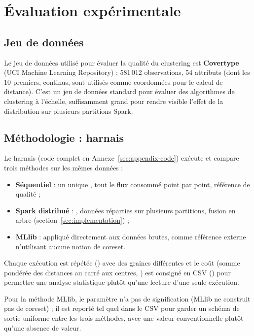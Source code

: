 \section{Évaluation expérimentale}
\label{sec:experiments}

\subsection{Jeu de données}

Le jeu de données utilisé pour évaluer la qualité du clustering est
\textbf{Covertype} (UCI Machine Learning Repository) : 581\,012 observations,
54 attributs (dont les 10 premiers, continus, sont utilisés comme
coordonnées pour le calcul de distance). C'est un jeu de données standard
pour évaluer des algorithmes de clustering à l'échelle, suffisamment grand
pour rendre visible l'effet de la distribution sur plusieurs partitions
Spark.

\subsection{Méthodologie : harnais }

Le harnais  (code complet en
Annexe~\ref{sec:appendix-code}) exécute et compare trois méthodes sur les
mêmes données :
\begin{itemize}
  \item \textbf{Séquentiel} : un unique , tout le flux
        consommé point par point, référence de qualité ;
  \item \textbf{Spark distribué} : ,
        données réparties sur plusieurs partitions, fusion en arbre
        (section~\ref{sec:implementation}) ;
  \item \textbf{MLlib} : 
        appliqué directement aux données brutes, comme référence externe
        n'utilisant aucune notion de coreset.
\end{itemize}
Chaque exécution est répétée () avec des graines différentes
et le coût (somme pondérée des distances au carré aux centres,
) est consigné en CSV
() pour permettre une
analyse statistique plutôt qu'une lecture d'une seule exécution.

Pour la méthode MLlib, le paramètre  n'a pas de signification
(MLlib ne construit pas de coreset) ; il est reporté tel quel dans le CSV
pour garder un schéma de sortie uniforme entre les trois méthodes, avec une
valeur conventionnelle plutôt qu'une absence de valeur.

